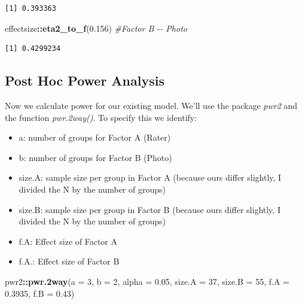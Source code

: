 \documentclass[
  11pt,
]{book}
\newenvironment{Shaded}{\begin{snugshade}}{\end{snugshade}}
\newcommand{\AttributeTok}[1]{\textcolor[rgb]{0.27,0.27,0.27}{#1}}
\newcommand{\CommentTok}[1]{\textcolor[rgb]{0.37,0.37,0.37}{\textit{#1}}}
\newcommand{\DecValTok}[1]{\textcolor[rgb]{0.06,0.06,0.06}{#1}}
\newcommand{\FloatTok}[1]{\textcolor[rgb]{0.06,0.06,0.06}{#1}}
\newcommand{\FunctionTok}[1]{\textcolor[rgb]{0.27,0.27,0.27}{\textbf{#1}}}
\newcommand{\NormalTok}[1]{#1}
\newcommand{\SpecialCharTok}[1]{\textcolor[rgb]{0.43,0.43,0.43}{\textbf{#1}}}
\providecommand{\tightlist}{%
  \setlength{\itemsep}{0pt}\setlength{\parskip}{0pt}}
\begin{document}
\begin{verbatim}
[1] 0.393363
\end{verbatim}

\begin{Shaded}
\begin{Highlighting}[]
\NormalTok{effectsize}\SpecialCharTok{::}\FunctionTok{eta2\_to\_f}\NormalTok{(}\FloatTok{0.156}\NormalTok{)  }\CommentTok{\#Factor B {-}{-} Photo}
\end{Highlighting}
\end{Shaded}

\begin{verbatim}
[1] 0.4299234
\end{verbatim}

\hypertarget{post-hoc-power-analysis}{%
\subsection{Post Hoc Power Analysis}\label{post-hoc-power-analysis}}

Now we calculate power for our existing model. We'll use the package \emph{pwr2} and the function \emph{pwr.2way()}. To specify this we identify:

\begin{itemize}
\tightlist
\item
  a: number of groups for Factor A (Rater)
\item
  b: number of groups for Factor B (Photo)
\item
  size.A: sample size per group in Factor A (because ours differ slightly, I divided the N by the number of groups)
\item
  size.B: sample size per group in Factor B (because ours differ slightly, I divided the N by the number of groups)
\item
  f.A: Effect size of Factor A
\item
  f.A.: Effect size of Factor B
\end{itemize}

\begin{Shaded}
\begin{Highlighting}[]
\NormalTok{pwr2}\SpecialCharTok{::}\FunctionTok{pwr.2way}\NormalTok{(}\AttributeTok{a =} \DecValTok{3}\NormalTok{, }\AttributeTok{b =} \DecValTok{2}\NormalTok{, }\AttributeTok{alpha =} \FloatTok{0.05}\NormalTok{, }\AttributeTok{size.A =} \DecValTok{37}\NormalTok{, }\AttributeTok{size.B =} \DecValTok{55}\NormalTok{, }\AttributeTok{f.A =} \FloatTok{0.3935}\NormalTok{,}
    \AttributeTok{f.B =} \FloatTok{0.43}\NormalTok{)}
\end{Highlighting}
\end{Shaded}
\end{document}
